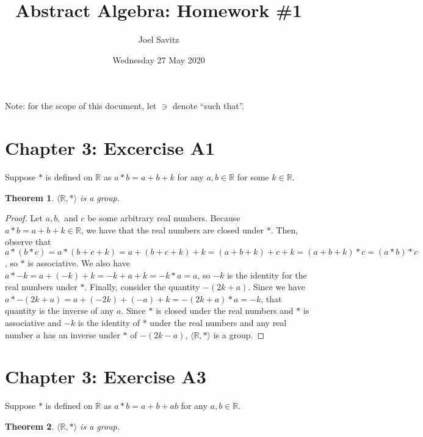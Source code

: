 \documentclass[12pt]{article}
\title{Abstract Algebra: Homework \#1}
\date{Wednesday 27 May 2020}
\author{Joel Savitz}
\newcommand{\reals}{\mathbb{R}}
\newtheorem{thm}{Theorem}
\begin{document}
\maketitle

Note: for the scope of this document, let $\ni$ denote ``such that''.

\section{Chapter 3: Excercise A1}

Suppose $*$ is defined on $\reals$ as $a * b = a + b + k$ for any $a,b \in \reals$ for some $k \in \reals$.

\begin{thm}
	$\langle \reals, * \rangle$ is a group.
\end{thm}

\begin{proof}
	Let $a,b,$ and $c$ be some arbitrary real numbers.
	Because $a * b = a + b + k \in \reals$, we have that the real numbers are closed under $*$.
	Then, observe that $a * (b * c)  = a * (b + c + k) = a + (b + c + k) + k = (a + b + k) + c + k = (a + b + k) * c = (a * b) * c$, so $*$ is associative.
	We also have $a * -k = a + (-k) + k = -k + a + k = -k * a = a$, so $-k$ is the identity for the real numbers under $*$.
	Finally, consider the quantity $-(2k+a)$. Since we have $a * -(2k+a) = a + (-2k) +  (-a) + k = -(2k+a) * a = -k$, that quantity is the inverse of any $a$.
	Since $*$ is closed under the real numbers and $*$ is associative and $-k$ is the identity of $*$ under the real numbers and any real number $a$ has an inverse under $*$ of $-(2k-a)$, $\langle \reals, * \rangle$ is a group.
\end{proof}

\section{Chapter 3: Exercise A3}

Suppose $*$ is defined on $\reals$ as $a * b = a + b + ab$ for any $a,b \in \reals$.

\begin{thm}
	$\langle \reals, * \rangle$ is a group.
\end{thm}
\end{document}
